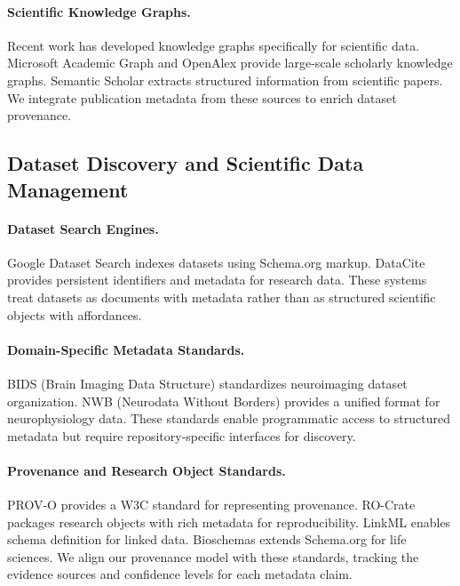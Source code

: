 \documentclass{article}
\theoremstyle{definition}
\begin{document}
\paragraph{Scientific Knowledge Graphs.} Recent work has developed knowledge graphs specifically for scientific data. Microsoft Academic Graph \citep{sinha2015overview} and OpenAlex \citep{priem2022openalex} provide large-scale scholarly knowledge graphs. Semantic Scholar \citep{ammar2018construction} extracts structured information from scientific papers. We integrate publication metadata from these sources to enrich dataset provenance.

\subsection{Dataset Discovery and Scientific Data Management}

\paragraph{Dataset Search Engines.} Google Dataset Search \citep{brickley2019google} indexes datasets using Schema.org markup. DataCite \citep{datacite2021metadata} provides persistent identifiers and metadata for research data. These systems treat datasets as documents with metadata rather than as structured scientific objects with affordances.

\paragraph{Domain-Specific Metadata Standards.} BIDS (Brain Imaging Data Structure) \citep{gorgolewski2016brain} standardizes neuroimaging dataset organization. NWB (Neurodata Without Borders) \citep{teeters2015neurodata, rubel2022nwb} provides a unified format for neurophysiology data. These standards enable programmatic access to structured metadata but require repository-specific interfaces for discovery.

\paragraph{Provenance and Research Object Standards.} PROV-O \citep{lebo2013prov} provides a W3C standard for representing provenance. RO-Crate \citep{soiland2022packaging} packages research objects with rich metadata for reproducibility. LinkML \citep{moxon2021linkml} enables schema definition for linked data. Bioschemas \citep{gray2017bioschemas} extends Schema.org for life sciences. We align our provenance model with these standards, tracking the evidence sources and confidence levels for each metadata claim.
\end{document}
